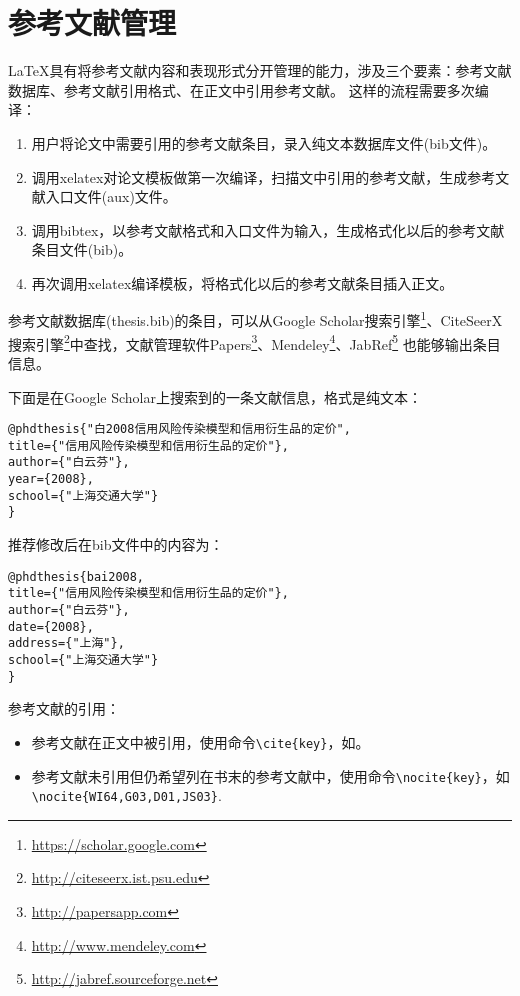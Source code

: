 \section{参考文献管理}
\label{sec2.5}
\LaTeX 具有将参考文献内容和表现形式分开管理的能力，涉及三个要素：参考文献数据库、参考文献引用格式、在正文中引用参考文献。
这样的流程需要多次编译：
\begin{enumerate}[noitemsep,topsep=0pt,parsep=0pt,partopsep=0pt]
\item 用户将论文中需要引用的参考文献条目，录入纯文本数据库文件(bib文件)。
\item 调用xelatex对论文模板做第一次编译，扫描文中引用的参考文献，生成参考文献入口文件(aux)文件。
\item 调用bibtex，以参考文献格式和入口文件为输入，生成格式化以后的参考文献条目文件(bib)。
\item 再次调用xelatex编译模板，将格式化以后的参考文献条目插入正文。
\end{enumerate}

参考文献数据库(thesis.bib)的条目，可以从Google Scholar搜索引擎\footnote{\url{https://scholar.google.com}}、CiteSeerX搜索引擎\footnote{\url{http://citeseerx.ist.psu.edu}}中查找，文献管理软件Papers\footnote{\url{http://papersapp.com}}、Mendeley\footnote{\url{http://www.mendeley.com}}、JabRef\footnote{\url{http://jabref.sourceforge.net}} 也能够输出条目信息。

下面是在Google Scholar上搜索到的一条文献信息，格式是纯文本：

\begin{lstlisting}[caption={从Google Scholar找到的参考文献条目}, label=googlescholar, escapeinside="", numbers=none]
@phdthesis{"白2008信用风险传染模型和信用衍生品的定价",
title={"信用风险传染模型和信用衍生品的定价"},
author={"白云芬"},
year={2008},
school={"上海交通大学"}
}
\end{lstlisting}

推荐修改后在bib文件中的内容为：

\begin{lstlisting}[caption={修改后的参考文献条目}, label=itemok, escapeinside="", numbers=none]
@phdthesis{bai2008,
title={"信用风险传染模型和信用衍生品的定价"},
author={"白云芬"},
date={2008},
address={"上海"},
school={"上海交通大学"}
}
\end{lstlisting}

参考文献的引用：
\begin{itemize}
\item 参考文献在正文中被引用，使用命令\verb+\cite{key}+，如\cite{M91}。
\item 参考文献未引用但仍希望列在书末的参考文献中，使用命令\verb+\nocite{key}+，如\verb+\nocite{WI64,G03,D01,JS03}+.
\end{itemize}
\nocite{WI64,G03,D01,JS03}
